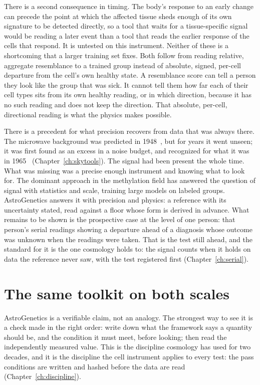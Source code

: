 There is a second consequence in timing. The body's response to an early change can precede the point at which the affected tissue
sheds enough of its own signature to be detected directly, so a tool that waits for a tissue-specific signal would be reading a later
event than a tool that reads the earlier response of the cells that respond. \conjecture{} It is untested on this instrument.
\openprob{} Neither of these is a shortcoming that a larger training set fixes. Both follow from reading relative, aggregate resemblance
to a trained group instead of absolute, signed, per-cell departure from the cell's own healthy state. A resemblance score can tell a
person they look like the group that was sick. It cannot tell them how far each of their cell types sits from its own healthy reading, or
in which direction, because it has no such reading and does not keep the direction. That absolute, per-cell, directional reading is what
the physics makes possible. \interp

There is a precedent for what precision recovers from data that was always there. The microwave background was predicted in
1948~\cite{AlpherHerman1948}, but for years it went unseen; it was first found as an excess in a noise budget, and recognized for what it
was in 1965~\cite{PenziasWilson1965,Dicke1965} (Chapter~\ref{ch:skytools}). \observed{} The signal had been present the whole time. What
was missing was a precise enough instrument and knowing what to look for. The dominant approach in the methylation field has answered the
question of signal with statistics and scale, training large models on labeled groups. AstroGenetics answers it with precision and
physics: a reference with its uncertainty stated, read against a floor whose form is derived in advance. What remains to be shown is the
prospective case at the level of one person: that person's serial readings showing a departure ahead of a diagnosis whose outcome was
unknown when the readings were taken. That is the test still ahead, and the standard for it is the one cosmology holds to: the signal
counts when it holds on data the reference never saw, with the test registered first (Chapter~\ref{ch:serial}). \openprob

\section{The same toolkit on both scales}\label{sec:ag_both}

AstroGenetics is a verifiable claim, not an analogy. The strongest way to see it is a check made in the right order: write down what the
framework says a quantity should be, and the condition it must meet, before looking; then read the independently measured value. This is
the discipline cosmology has used for two decades, and it is the discipline the cell instrument applies to every test: the pass conditions
are written and hashed before the data are read (Chapter~\ref{ch:discipline}).

